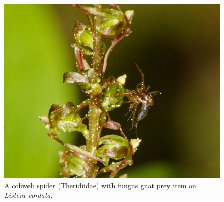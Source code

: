 \begin{multicols}{2}
\begin{figure}[H]
\begin{center}
\vspace{2mm}
\includegraphics[width=\textwidth]{img/Theridiidae_Sciaroidea.jpg}
\caption{A cobweb spider (Theridiidae) with fungus gnat prey item on \emph{Listera cordata}.}
\label{Theridiidae_Sciaroidea}
\end{center}
\end{figure}


\end{multicols}
